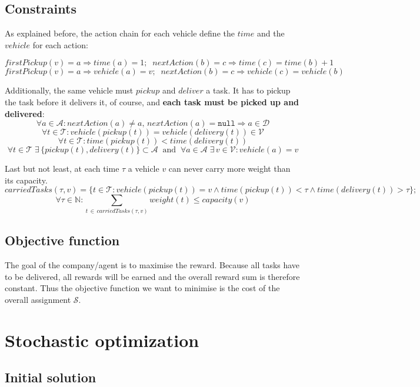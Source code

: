\documentclass[11pt]{article}
\begin{document}
\subsection{Constraints}
As explained before, the action chain for each vehicle define the $time$ 
and the $vehicle$ for each action:

$$
firstPickup(v) = a \Rightarrow time(a) = 1; \;\;
nextAction(b) = c \Rightarrow time(c) = time(b) + 1
$$
$$
firstPickup(v) = a \Rightarrow vehicle(a) = v; \;\;
nextAction(b) = c \Rightarrow vehicle(c) = vehicle(b)
$$

Additionally, the same vehicle must $pickup$ and $deliver$ a task. 
It has to pickup the task before it delivers it, of course, 
and \textbf{each task must be picked up and delivered}:
$$
\forall a \in \mathcal{A}  :
nextAction(a) \neq a, \,
nextAction(a) = \mathtt{null} \Rightarrow a \in \mathcal{D}
$$
$$
\forall t \in \mathcal{T}: 
vehicle(pickup(t)) = vehicle(delivery(t)) \in \mathcal{V}
$$
$$
\forall t \in \mathcal{T}: 
time(pickup(t)) < time(delivery(t))
$$
$$
\forall t \in \mathcal{T} \; 
\exists  \, \{ pickup(t), delivery(t) \} \subset \mathcal{A} \;\;
\text{and} \;\;
\forall a \in \mathcal{A} \;
\exists \, v \in \mathcal{V} : 
vehicle(a) = v
$$

Last but not least, at each time $\tau$ a vehicle $v$ can never 
carry more weight than its capacity.
$$
carriedTasks(\tau, v) = \{t \in \mathcal{T}: 
vehicle(pickup(t)) = v \wedge 
time(pickup(t)) < \tau \wedge 
time(delivery(t)) > \tau \};
$$
$$
\forall \tau \in \mathbb{N}:
\sum_{t \, \in \, carriedTasks(\tau, v)} weight(t) \leq
capacity(v)
$$



\subsection{Objective function}
The goal of the company/agent is to maximise the reward. Because all tasks 
have to be delivered, all rewards will be earned and the overall reward
sum is therefore constant. Thus the objective function we want to minimise 
is the cost of the overall assignment $\mathcal{S}$.


\section{Stochastic optimization}

\subsection{Initial solution}
\end{document}
